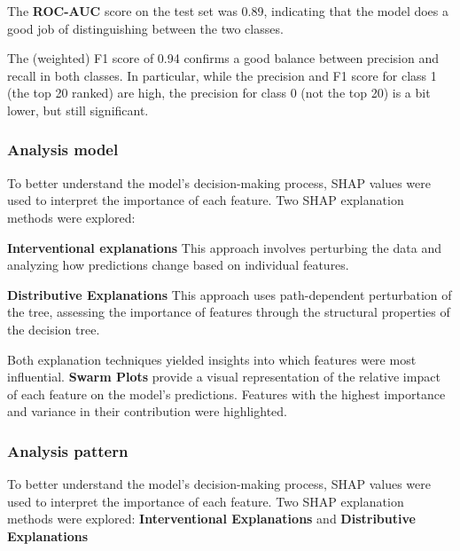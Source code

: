 \documentclass[a4paper, twoside]{article}
\begin{document}
The \textbf{ROC-AUC} score on the test set was 0.89, indicating that the model does a good job of distinguishing between the two classes.

The (weighted) F1 score of 0.94 confirms a good balance between precision and recall in both classes. In particular, while the precision and F1 score for class 1 (the top 20 ranked) are high, the precision for class 0 (not the top 20) is a bit lower, but still significant.

\subsubsection{Analysis model}

To better understand the model's decision-making process, SHAP values were used to interpret the importance of each feature. Two SHAP explanation methods were explored:

\textbf{Interventional explanations}
This approach involves perturbing the data and analyzing how predictions change based on individual features.

\textbf{Distributive Explanations} This approach uses path-dependent perturbation of the tree, assessing the importance of features through the structural properties of the decision tree.

Both explanation techniques yielded insights into which features were most influential. \textbf{Swarm Plots} provide a visual representation of the relative impact of each feature on the model's predictions. Features with the highest importance and variance in their contribution were highlighted.

\subsubsection{Analysis pattern}

To better understand the model's decision-making process, SHAP values were used to interpret the importance of each feature. Two SHAP explanation methods were explored: \textbf{Interventional Explanations} and \textbf{Distributive Explanations}
\end{document}

